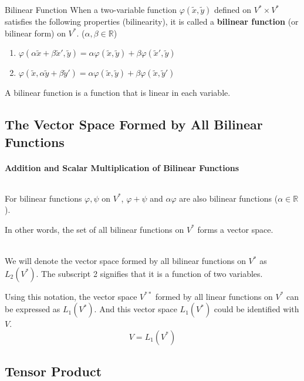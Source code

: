 \documentclass[uplatex,a4j,12pt,dvipdfmx]{jsarticle}
\begin{document}
\begin{itembox}[l]{Bilinear Function}
	When a two-variable function
	$\varphi(\tilde{x},\tilde{y})$ defined on $V^{*} \times V^{*}$
	satisfies the following properties (bilinearity),
	it is called a \textbf{bilinear function} (or bilinear form) on $V^{*}$. ($\alpha, \beta \in \mathbb{R}$)
	\begin{enumerate}
		\item $\varphi(\alpha \tilde{x} + \beta \tilde{x}', \tilde{y}) = \alpha \varphi( \tilde{x}, \tilde{y}) + \beta \varphi( \tilde{x}', \tilde{y})$
		\item $\varphi(\tilde{x}, \alpha \tilde{y} + \beta \tilde{y}') = \alpha \varphi( \tilde{x}, \tilde{y}) + \beta \varphi( \tilde{x}, \tilde{y}')$
	\end{enumerate}
\end{itembox}

A bilinear function is a function that is linear in each variable.

\subsection{The Vector Space Formed by All Bilinear Functions}

\paragraph{Addition and Scalar Multiplication of Bilinear Functions}

${}$

For bilinear functions $\varphi, \psi$ on $V^{*}$,
$\varphi + \psi$ and $\alpha \varphi$ are also bilinear functions
($\alpha \in \mathbb{R}$).

In other words, the set of all bilinear functions on $V^{*}$ forms a vector space.

\ \\

We will denote the vector space formed by all bilinear functions on $V^{*}$ as $L_{2}(V^{*})$.
The subscript 2 signifies that it is a function of two variables.

Using this notation, the vector space $V^{**}$ formed by all linear functions on $V^{*}$ can be expressed as
$L_{1}(V^{*})$.
And this vector space $L_{1}(V^{*})$ could be identified with $V$.
$$
	V = L_{1}(V^{*})
$$

\subsection{Tensor Product}
\end{document}
